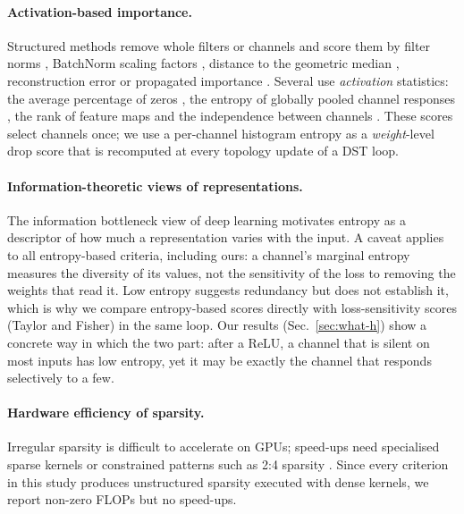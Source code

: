 \paragraph{Activation-based importance.}
Structured methods remove whole filters or channels and score them by filter norms \cite{li2016pruning}, BatchNorm scaling factors \cite{liu2017learning}, distance to the geometric median \cite{he2019filter}, reconstruction error \cite{luo2017thinet,he2017channel} or propagated importance \cite{yu2018nisp}. Several use \emph{activation} statistics: the average percentage of zeros \cite{hu2016network}, the entropy of globally pooled channel responses \cite{luo2017entropy}, the rank of feature maps \cite{lin2020hrank} and the independence between channels \cite{sui2021chip}. These scores select channels once; we use a per-channel histogram entropy as a \emph{weight}-level drop score that is recomputed at every topology update of a DST loop.

\paragraph{Information-theoretic views of representations.}
The information bottleneck view of deep learning \cite{tishby2015deep,shwartz2017opening} motivates entropy as a descriptor of how much a representation varies with the input. A caveat applies to all entropy-based criteria, including ours: a channel's marginal entropy measures the diversity of its values, not the sensitivity of the loss to removing the weights that read it. Low entropy suggests redundancy but does not establish it, which is why we compare entropy-based scores directly with loss-sensitivity scores (Taylor and Fisher) in the same loop. Our results (Sec.~\ref{sec:what-h}) show a concrete way in which the two part: after a ReLU, a channel that is silent on most inputs has low entropy, yet it may be exactly the channel that responds selectively to a few.

\paragraph{Hardware efficiency of sparsity.}
Irregular sparsity is difficult to accelerate on GPUs; speed-ups need specialised sparse kernels \cite{gale2020sparse,elsen2020fast} or constrained patterns such as 2:4 sparsity \cite{mishra2021accelerating,zhou2021nm}. Since every criterion in this study produces unstructured sparsity executed with dense kernels, we report non-zero FLOPs but no speed-ups.

